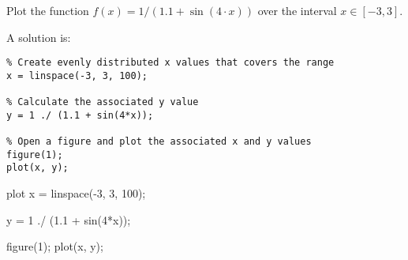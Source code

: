 \begin{ex}
Plot the function $f(x) = 1 / (1.1 + \sin(4 \cdot x))$
over the interval $x \in [-3, 3]$.
\begin{sol}
A solution is:
\begin{lstlisting}
% Create evenly distributed x values that covers the range
x = linspace(-3, 3, 100);

% Calculate the associated y value
y = 1 ./ (1.1 + sin(4*x));

% Open a figure and plot the associated x and y values
figure(1);
plot(x, y);
\end{lstlisting}
\end{sol}
\begin{solutionfile}{plot}
x = linspace(-3, 3, 100);

y = 1 ./ (1.1 + sin(4*x));

figure(1);
plot(x, y);
\end{solutionfile}
\end{ex}
